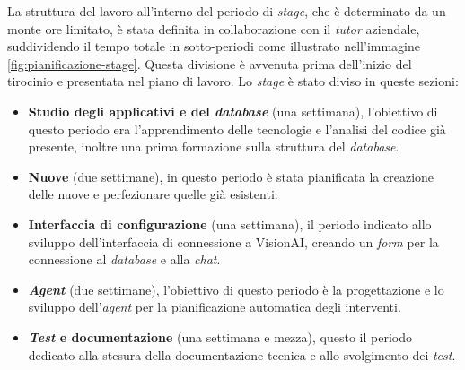 La struttura del lavoro all'interno del periodo di \textit{stage}, che è determinato da un monte ore limitato, è stata definita in collaborazione con il \textit{tutor} aziendale, suddividendo il tempo totale in sotto-periodi come illustrato nell'immagine \ref{fig:pianificazione-stage}. Questa divisione è avvenuta prima dell'inizio del tirocinio e presentata nel piano di lavoro.
Lo \textit{stage} è stato diviso in queste sezioni:
\begin{itemize}
    \item \textbf{Studio degli applicativi e del \textit{database}} (una settimana), l'obiettivo di questo periodo era l'apprendimento delle tecnologie e l'analisi del codice già presente, inoltre una prima formazione sulla struttura del \textit{database}.
    \item \textbf{Nuove } (due settimane), in questo periodo è stata pianificata la creazione delle nuove  e perfezionare quelle già esistenti.
    \item \textbf{Interfaccia di configurazione} (una settimana), il periodo indicato allo sviluppo dell'interfaccia di connessione a VisionAI, creando un \textit{form} per la connessione al \textit{database} e alla \textit{chat}.
    \item \textbf{\textit{Agent}} (due settimane), l'obiettivo di questo periodo è la progettazione e lo sviluppo dell'\textit{agent} per la pianificazione automatica degli interventi.
    \item \textbf{\textit{Test} e documentazione} (una settimana e mezza), questo il periodo dedicato alla stesura della documentazione tecnica e allo svolgimento dei \textit{test}.
\end{itemize}

